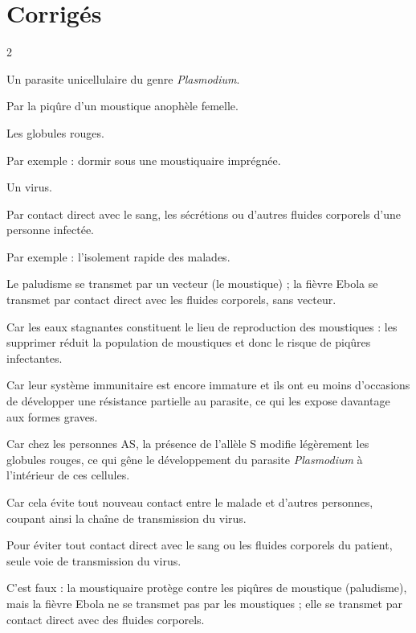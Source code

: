 \section{Corrigés}
\begin{multicols}{2}

Un parasite unicellulaire du genre \textit{Plasmodium}.

Par la piqûre d'un moustique anophèle femelle.

Les globules rouges.

Par exemple : dormir sous une moustiquaire imprégnée.

Un virus.

Par contact direct avec le sang, les sécrétions ou d'autres fluides corporels d'une
personne infectée.

Par exemple : l'isolement rapide des malades.

Le paludisme se transmet par un vecteur (le moustique) ; la fièvre Ebola se transmet
par contact direct avec les fluides corporels, sans vecteur.

Car les eaux stagnantes constituent le lieu de reproduction des moustiques : les
supprimer réduit la population de moustiques et donc le risque de piqûres
infectantes.

Car leur système immunitaire est encore immature et ils ont eu moins d'occasions de
développer une résistance partielle au parasite, ce qui les expose davantage aux
formes graves.

Car chez les personnes AS, la présence de l'allèle S modifie légèrement les globules
rouges, ce qui gêne le développement du parasite \textit{Plasmodium} à l'intérieur de
ces cellules.

Car cela évite tout nouveau contact entre le malade et d'autres personnes, coupant
ainsi la chaîne de transmission du virus.

Pour éviter tout contact direct avec le sang ou les fluides corporels du patient,
seule voie de transmission du virus.

C'est faux : la moustiquaire protège contre les piqûres de moustique (paludisme),
mais la fièvre Ebola ne se transmet pas par les moustiques ; elle se transmet par
contact direct avec des fluides corporels.


\end{multicols}
